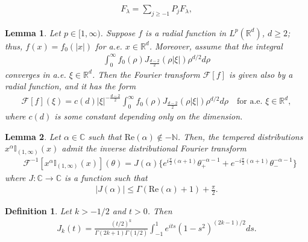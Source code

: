 \documentclass[10pt,a4paper]{amsart}
\newtheorem{definition}{Definition}
\newtheorem{lemma}{Lemma}
\begin{document}
\begin{align}
			F_{\lambda} = \sum_{j \geq -1} P_{j}F_{\lambda},
			\label{eq:lp-decomp}
		\end{align}

\begin{lemma}\label{lemma:ftransformradial_bessel}
		Let $p \in [1,\infty)$. Suppose $f$ is a radial function in  $L^p(\mathbb{R}^d)$, $d \geq 2$; thus, $f(x) = f_0(|x|)$ for a.e. $x \in \mathbb{R}^d$. Moreover, assume that the integral
\begin{align}\label{eq:convcond-radialexp}
\int_0^{\infty} f_0(\rho) J_{\frac{d-2}{2}}(\rho|\xi|) \rho^{d/2} d\rho
\end{align}		
converges in a.e. $\xi \in \mathbb{R}^d$. Then the Fourier transform $\mathcal{F}[f]$ is given also by a radial function, and it has the form
		\begin{align*}
			\mathcal{F}[f](\xi) = c(d) |\xi|^{-\frac{d-2}{2}} \int_0^{\infty} f_0(\rho) J_{\frac{d-2}{2}}(\rho|\xi|) \rho^{d/2} d\rho \quad \text{for a.e. } \xi \in \mathbb{R}^d,
		\end{align*}
		where $c(d)$ is some constant depending only on the dimension.
	\end{lemma}

	\begin{lemma}\label{lemma:invft-xalpha-nu}
	Let $\alpha \in \mathbb{C}$ such that $\text{Re}(\alpha) \notin -\mathbb{N}$. Then, the tempered distributions $x^{\alpha} \mathbb{I}_{(1,\infty)}(x)$ admit the inverse distributional Fourier transform
	\begin{align*}
	&\mathcal{F}^{-1}[x^{\alpha} \mathbb{I}_{(1,\infty)}(x)](\theta)= J(\alpha) \{ e^{i\frac{\pi}{2}(\alpha+1)} \theta_+^{-\alpha-1} + e^{-i\frac{\pi}{2}(\alpha+1)} \theta_-^{-\alpha-1} \}
	\end{align*}
	where $J : \mathbb{C} \rightarrow \mathbb{C}$ is a function such that
	\begin{align*}
	|J(\alpha)| \leq \Gamma(\text{Re}(\alpha)+1) + \frac{\pi}{2}.
	\end{align*}
	\end{lemma}

	\begin{definition}\label{lemma:bessel_kreal}
		Let $k > -1/2$ and $t > 0$. Then
		\begin{align}\label{eq:bessel2}
			J_k(t) = \frac{(t/2)^k}{\Gamma(2k+1)\Gamma(1/2)} \int_{-1}^1 e^{its} (1-s^2)^{(2k-1)/2}ds.
		\end{align}
	\end{definition}
\end{document}
